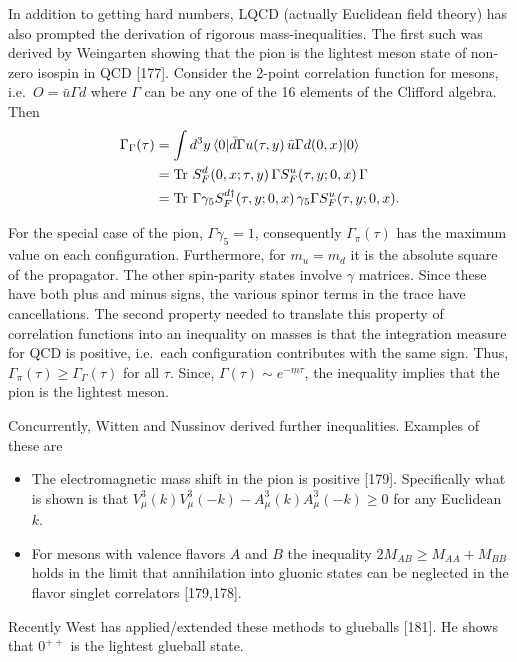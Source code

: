 In addition to getting hard numbers, LQCD (actually Euclidean field theory) has also prompted the derivation of rigorous mass-inequalities. The first such was derived by Weingarten showing that the pion is the lightest meson state of non-zero isospin in QCD [177]. Consider the 2-point correlation function for mesons, i.e.\ $O = \bar{u}\Gamma d$ where $\Gamma$ can be any one of the 16 elements of the Clifford algebra. Then
\begin{equation}
\begin{aligned}
\Gamma_{\Gamma}(\tau) &= \int d^3y\, \langle 0 | \bar{d}\Gamma u(\tau, y)\, \bar{u}\Gamma d(0, x) | 0 \rangle \\
&= \Tr\, S_F^d(0,x;\tau,y)\,\Gamma S_F^u(\tau,y;0,x)\,\Gamma \\
&= \Tr\, \Gamma\gamma_5 S_F^{d\dagger}(\tau,y;0,x)\,\gamma_5 \Gamma S_F^u(\tau,y;0,x).
\end{aligned}
\label{eq:18.4}
\end{equation}

For the special case of the pion, $\Gamma\gamma_5 = 1$, consequently $\Gamma_\pi(\tau)$ has the maximum value on each configuration. Furthermore, for $m_u = m_d$ it is the absolute square of the propagator. The other spin-parity states involve $\gamma$ matrices. Since these have both plus and minus signs, the various spinor terms in the trace have cancellations. The second property needed to translate this property of correlation functions into an inequality on masses is that the integration measure for QCD is positive, i.e.\ each configuration contributes with the same sign. Thus, $\Gamma_\pi(\tau) \ge \Gamma_\Gamma(\tau)$ for all $\tau$. Since, $\Gamma(\tau) \sim e^{-m\tau}$, the inequality implies that the pion is the lightest meson.

Concurrently, Witten and Nussinov derived further inequalities. Examples of these are
\begin{itemize}
  \item The electromagnetic mass shift in the pion is positive [179]. Specifically what is shown is that $V_\mu^3(k)V_\mu^3(-k) - A_\mu^3(k)A_\mu^3(-k) \ge 0$ for any Euclidean $k$.
  \item For mesons with valence flavors $A$ and $B$ the inequality $2M_{AB} \ge M_{AA} + M_{BB}$ holds in the limit that annihilation into gluonic states can be neglected in the flavor singlet correlators [179,178].
\end{itemize}

Recently West has applied/extended these methods to glueballs [181]. He shows that $0^{++}$ is the lightest glueball state.
